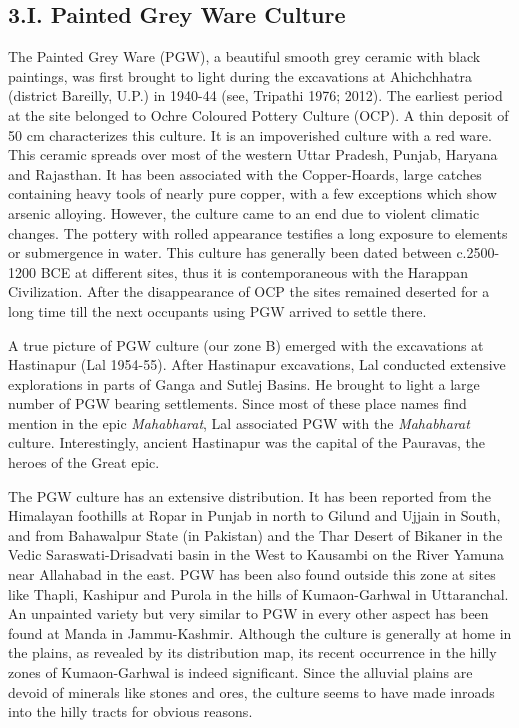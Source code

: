 \subsection*{3.I. Painted Grey Ware Culture}\label{subsection-8}

The Painted Grey Ware (PGW), a beautiful smooth grey ceramic with black paintings, was first brought to light during the excavations at Ahichchhatra (district Bareilly, U.P.) in 1940-44 (see, Tripathi 1976; 2012). The earliest period at the site belonged to Ochre Coloured Pottery Culture (OCP). A thin deposit of 50 cm characterizes this culture. It is an impoverished culture with a red ware. This ceramic spreads over most of the western Uttar Pradesh, Punjab, Haryana and Rajasthan. It has been associated with the Copper-Hoards, large catches containing heavy tools of nearly pure copper, with a few exceptions which show arsenic alloying. However, the culture came to an end due to violent climatic changes. The pottery with rolled appearance testifies a long exposure to elements or submergence in water. This culture has generally been dated between c.2500-1200 BCE at different sites, thus it is contemporaneous with the Harappan Civilization. After the disappearance of OCP the sites remained deserted for a long time till the next occupants using PGW arrived to settle there. 


A true picture of PGW culture (our zone B) emerged with the excavations at Hastinapur (Lal 1954-55). After Hastinapur excavations, Lal conducted extensive explorations in parts of Ganga and Sutlej Basins. He brought to light a large number of PGW bearing settlements. Since most of these place names find mention in the epic \textit{Mahabharat}, Lal associated PGW with the \textit{Mahabharat} culture. Interestingly, ancient Hastinapur was the capital of the Pauravas, the heroes of the Great epic. 

The PGW culture has an extensive distribution. It has been reported from the Himalayan foothills at Ropar in Punjab in north to Gilund and Ujjain in South, and from Bahawalpur State (in Pakistan) and the Thar Desert of Bikaner in the Vedic Saraswati-Drisadvati basin in the West to Kausambi on the River Yamuna near Allahabad in the east. PGW has been also found outside this zone at sites like Thapli, Kashipur and Purola in the hills of Kumaon-Garhwal in Uttaranchal. An unpainted variety but very similar to PGW in every other aspect has been found at Manda in Jammu-Kashmir. Although the culture is generally at home in the plains, as revealed by its distribution map, its recent occurrence in the hilly zones of Kumaon-Garhwal is indeed significant. Since the alluvial plains are devoid of minerals like stones and ores, the culture seems to have made inroads into the hilly tracts for obvious reasons.

